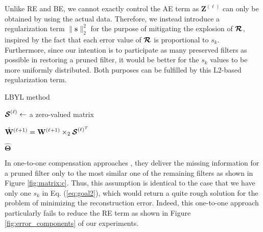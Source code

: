Unlike RE and BE, we cannot exactly control the AE term as $\mathbf{Z}^{(\ell)}$ can only be obtained by using the actual data. Therefore, we instead introduce a regularization term $\|\mathbf{s}\|_{2}^{2}$ for the purpose of mitigating the explosion of $\boldsymbol{\R}$, inspired by the fact that each error value of $\boldsymbol{\R}$ is proportional to $s_k$. Furthermore, since our intention is to participate as many preserved filters as possible in restoring a pruned filter, it would be better for the $s_k$ values to be more uniformly distributed. Both purposes can be fulfilled by this L2-based regularization term. 

\begin{algorithm}[t]
  \scriptsize
  \caption{LBYL method}
  \label{alg:Recovery}
   
    {
    ${\boldsymbol{\S}}^{(\ell)} \leftarrow $ a zero-valued matrix
    
    $\hat{\mathbf{W}}^{(\ell+1)} = \mathbf{W}^{(\ell+1)} \times_2 \boldsymbol{\S}^{(\ell)^T} $
    }
\Return $\hat{\mathbf{\Theta}}$
\end{algorithm}


In one-to-one compensation approaches \cite{NM,Data-free}, they deliver the missing information for a pruned filter only to the most similar one of the remaining filters as shown in Figure \ref{fig:matrix:c}. Thus, this assumption is identical to the case that we have only one $s_{k}$ in Eq. (\ref{eq:goal2}), which would return a quite rough solution for the problem of minimizing the reconstruction error. Indeed, this one-to-one approach particularly fails to reduce the RE term as shown in Figure \ref{fig:error_components} of our experiments.

